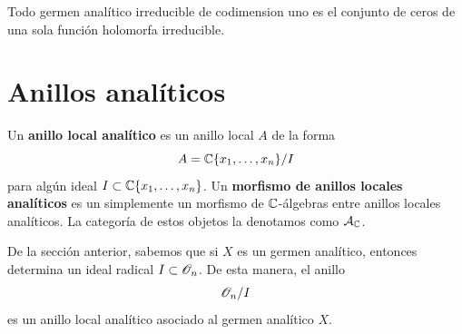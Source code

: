 \begin{propo}\label{hipersuperficiesenCn}
	Todo germen analítico irreducible de codimension uno es el conjunto de ceros de una sola función holomorfa irreducible.
\end{propo}

\section{Anillos analíticos}

\begin{definition}
	Un \textbf{anillo local analítico} es un anillo local $A$ de la forma 
	\begin{equation*}
		A=\mathbb{C}\{x_1,\dots,x_n\}/I
	\end{equation*}
	para algún ideal $I\subset \mathbb{C}\{x_1,\dots,x_n\}$. Un \textbf{morfismo de anillos locales analíticos} es un simplemente un morfismo de $\mathbb{C}$-álgebras entre anillos locales analíticos. La categoría de estos objetos la denotamos como $\mathcal{A}_{\mathbb{C}}$.
\end{definition}

De la sección anterior, sabemos que si $X$ es un germen analítico, entonces determina un ideal radical $I\subset \mathscr{O}_n$. De esta manera, el anillo
\begin{equation*}
	\mathscr{O}_n/I
\end{equation*}
es un anillo local analítico asociado al germen analítico $X$. 

